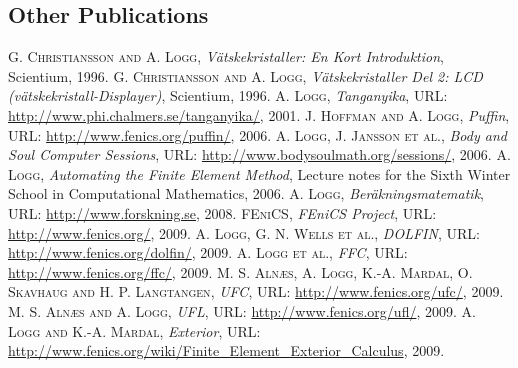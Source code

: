 \begin{thebibliography}{99}
\subsection*{Other Publications}
 {\textsc{G. Christiansson and A. Logg},
\textit{V\"atskekristaller: En Kort Introduktion},
Scientium,
1996.
}
 {\textsc{G. Christiansson and A. Logg},
\textit{V\"atskekristaller Del 2: {LCD} (v\"atskekristall-Displayer)},
Scientium,
1996.
}
 {\textsc{A. Logg},
\textit{Tanganyika},
URL: \url{http://www.phi.chalmers.se/tanganyika/},
2001.
}
 {\textsc{J. Hoffman and A. Logg},
\textit{Puffin},
URL: \url{http://www.fenics.org/puffin/},
2006.
}
 {\textsc{A. Logg, J. Jansson et al.},
\textit{{B}ody and {S}oul Computer Sessions},
URL: \url{http://www.bodysoulmath.org/sessions/},
2006.
}
 {\textsc{A. Logg},
\textit{Automating the Finite Element Method},
Lecture notes for the Sixth Winter School in Computational Mathematics,
2006.
}
 {\textsc{A. Logg},
\textit{Ber\"akningsmatematik},
URL: \url{http://www.forskning.se},
2008.
}
 {\textsc{{FE}ni{CS}},
\textit{{FE}ni{CS} Project},
URL: \url{http://www.fenics.org/},
2009.
}
 {\textsc{A. Logg, G. N. Wells et al.},
\textit{{DOLFIN}},
URL: \url{http://www.fenics.org/dolfin/},
2009.
}
 {\textsc{A. Logg et al.},
\textit{{FFC}},
URL: \url{http://www.fenics.org/ffc/},
2009.
}
 {\textsc{M. S. Aln{\ae}s, A. Logg, K.-A. Mardal, O. Skavhaug and H. P. Langtangen},
\textit{{UFC}},
URL: \url{http://www.fenics.org/ufc/},
2009.
}
 {\textsc{M. S. Aln{\ae}s and A. Logg},
\textit{{UFL}},
URL: \url{http://www.fenics.org/ufl/},
2009.
}
 {\textsc{A. Logg and K.-A. Mardal},
\textit{{Exterior}},
URL: \url{http://www.fenics.org/wiki/Finite_Element_Exterior_Calculus},
2009.
}
\end{thebibliography}